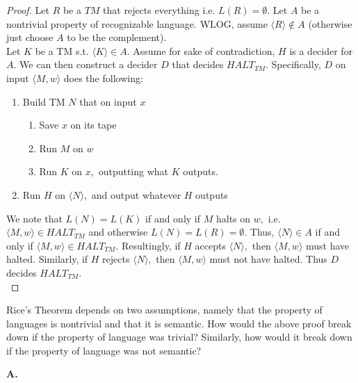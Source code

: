 \documentclass[10pt]{article}
\begin{document}
\begin{proof}
    Let $R$ be a $TM$ that rejects everything i.e. $L(R)=\emptyset.$ Let $A$ be a nontrivial property of recognizable language. WLOG, assume  $\langle R\rangle\notin A$ (otherwise just choose $A$ to be the complement).\\

Let $K$ be a TM s.t. $\langle K\rangle\in A.$ Assume for sake of contradiction, $H$ is a decider for $A.$ We can then construct a decider $D$ that decides $HALT_{TM}.$ Specifically, $D$ on input $\langle M, w\rangle$ does the following:
\begin{enumerate}
    \item Build TM $N$ that on input $x$\begin{enumerate}
        \item Save $x$ on its tape
        \item Run $M$ on $w$
        \item Run $K$ on $x,$ outputting what $K$ outputs.
    \end{enumerate}
    \item Run $H$ on $\langle N\rangle,$ and output whatever $H$ outputs 
\end{enumerate}
We note that $L(N) = L(K)$ if and only if $M$ halts on $w,$ i.e. $\langle M, w\rangle\in HALT_{TM}$ and otherwise $L(N) = L(R) = \emptyset.$ Thus, $\langle N\rangle\in A$ if and only if  $\langle M, w\rangle\in HALT_{TM}.$ Resultingly, if $H$ accepts $\langle N\rangle,$ then $\langle M, w\rangle$ must have halted. Similarly, if $H$ rejects $\langle N\rangle,$ then $\langle M, w\rangle$ must not have halted. Thus $D$ decides $HALT_{TM}.$\\
\end{proof}


\noindent
Rice's Theorem depends on two assumptions, namely that the property of languages is nontrivial and that it is semantic. How would the above proof break down if the property of language was trivial? Similarly, how would it break down if the property of language was not semantic?


\newpage
\noindent
\textbf{A. }
\end{document}
